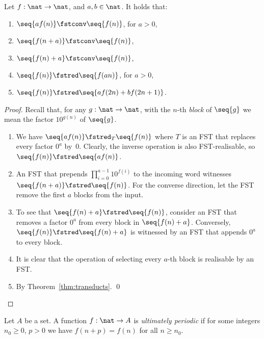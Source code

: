 \begin{lemma}\label{lem:basic}
  Let $f : \nat \to \nat$, and $a,b \in \nat$.
  It holds that:
  \begin{enumerate}
    \item 
      \label{item:lem:basic:mult}
      $\seq{a f(n)} \fstconv \seq{f(n)}$, for $a \gt 0$,
    \item 
      $\seq{f(n + a)} \fstconv \seq{f(n)}$,
      \label{item:lem:basic:xshift}
    \item 
      $\seq{f(n) + a} \fstconv \seq{f(n)}$,
      \label{item:lem:basic:yshift}
    \item 
      $\seq{f(n)} \fstred \seq{f(an)}$, for $a \gt 0$,
      \label{item:lem:basic:sub}
    \item 
      $\seq{f(n)} \fstred \seq{a f(2n) + b f(2n+1)}$.
      \label{item:lem:basic:merge}
  \end{enumerate}
\end{lemma}
\begin{proof}Recall that, for any $g : \nat \to \nat$,
  with the $n$-th \emph{block} of $\seq{g}$ we mean the factor $10^{g(n)}$ of $\seq{g}$.
  \begin{enumerate}
    \item 
      We have $\seq{a f(n)} \fstred_T \seq{f(n)}$ where $T$ is an FST that replaces 
      every factor $0^a$ by~$0$.
      Clearly, the inverse operation is also FST-realisable, so $\seq{f(n)} \fstred \seq{a f(n)}$.
    \item 
      An FST that prepends 
      $\prod_{i = 0}^{a-1} 1 0^{f(i)}$
      to the incoming word
      witnesses $\seq{f(n + a)} \fstred \seq{f(n)}$.
      For the converse direction, let the FST remove the first $a$ blocks from the input.
    \item 
      To see that $\seq{f(n) + a} \fstred \seq{f(n)}$, 
      consider an FST that removes a factor $0^a$ from every block in $\seq{f(n) + a}$.
      Conversely, $\seq{f(n)} \fstred \seq{f(n) + a}$ is witnessed by an FST that appends $0^a$ to every block.
    \item 
      It is clear that the operation of selecting every $a$-th block is realisable by an FST.
    \item 
      By Theorem~\ref{thm:transducts}.
    \qed
  \end{enumerate}
\end{proof}


\begin{definition}\label{def:periodic}
  Let $A$ be a set.
  A function $f : \nat \to A$ 
  is \emph{ultimately periodic}
  if for some integers $n_0 \ge 0$, $p > 0$ we have
  $f(n + p) = f(n)$ for all $n \ge n_0$.
\end{definition}  

